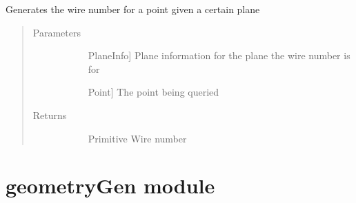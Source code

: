 \documentclass[letterpaper,10pt,english]{sphinxmanual}
\begin{document}
\begin{fulllineitems}
\label{\detokenize{utilities:utilities.wireNumberFromPoint}}
Generates the wire number for a point given a certain plane
\begin{quote}\begin{description}
\item[{Parameters}] \leavevmode\begin{description}
\item[{}] \leavevmode{[}PlaneInfo{]}
Plane information for the plane the wire number is for

\item[{}] \leavevmode{[}Point{]}
The point being queried

\end{description}

\item[{Returns}] \leavevmode\begin{description}
\item[{}] \leavevmode
Primitive Wire number

\end{description}

\end{description}\end{quote}

\end{fulllineitems}



\section{geometryGen module}
\label{\detokenize{geometryGen:module-geometryGen}}\label{\detokenize{geometryGen:geometrygen-module}}\label{\detokenize{geometryGen::doc}}
\end{document}
